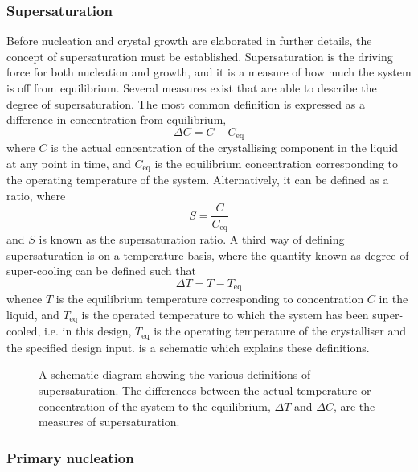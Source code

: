 \subsubsection{Supersaturation}

Before nucleation and crystal growth are elaborated in further details, the concept of supersaturation must be established. Supersaturation is the driving force for both nucleation and growth, and it is a measure of how much the system is off from equilibrium. Several measures exist that are able to describe the degree of supersaturation. The most common definition is expressed as a difference in concentration from equilibrium,
\begin{equation}\label{eq:deltaC}
    \Delta C = C - C_{\mathrm{eq}}
\end{equation}
where $C$ is the actual concentration of the crystallising component in the liquid at any point in time, and $C_{\mathrm{eq}}$ is the equilibrium concentration corresponding to the operating temperature of the system. Alternatively, it can be defined as a ratio, where
\begin{equation} \label{eq: supersaturation ratio}
    S = \frac{C}{C_{\mathrm{eq}}}
\end{equation}
and $S$ is known as the supersaturation ratio. A third way of defining supersaturation is on a temperature basis, where the quantity known as degree of super-cooling can be defined such that
\begin{equation} \label{eq:deltaT}
     \Delta T = T - T_{\mathrm{eq}}
\end{equation}
whence $T$ is the equilibrium temperature corresponding to concentration $C$ in the liquid, and $T_{\mathrm{eq}}$ is the operated temperature to which the system has been super-cooled, i.e. in this design, $T_{\mathrm{eq}}$ is the operating temperature of the crystalliser and the specified design input.  is a schematic which explains these definitions.

\begin{figure}[h]
\centering

\caption{A schematic diagram showing the various definitions of supersaturation. The differences between the actual temperature or concentration of the system to the equilibrium, $\Delta T$ and $\Delta C$, are the measures of supersaturation.}
\label{fig:supersaturation}
\end{figure}

\subsubsection{Primary nucleation}\label{sec:primary nucleation}


